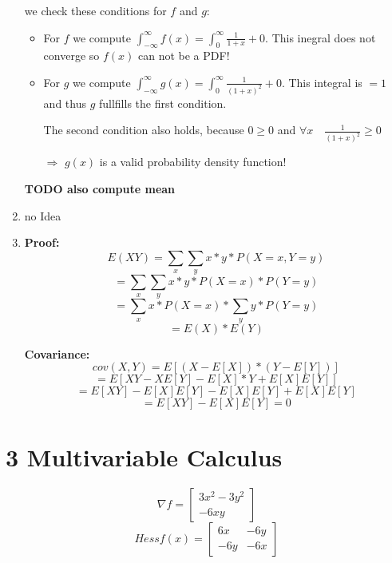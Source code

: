 \documentclass[12pt]{article}
\begin{document}
\begin{enumerate}[1)]
        we check these conditions for $f$ and $g$:
        \begin{itemize}
            \item 
                For $f$ we compute $\int_{-\infty}^{\infty} f(x) = \int_{0}^{\infty} \frac{1}{1+x} + 0$. This inegral does not converge so $f(x)$ can not be a PDF!
            \item
                For $g$ we compute $\int_{-\infty}^{\infty} g(x) = \int_{0}^{\infty} \frac{1}{(1+x)^2} + 0$. This integral is $ = 1$ and thus $g$ fullfills the first condition.

                The second condition also holds, because $0 \geq 0$ and $\forall x \quad \frac{1}{(1+x)^2} \geq 0$

                $\Rightarrow$ $g(x)$ is a valid probability density function!

        \end{itemize}


        \textbf{TODO also compute mean}

    \item
        no Idea

    \item
        \textbf{Proof:}\\
        $$ E( X Y ) = \sum_x \sum_y x * y * P(X=x, Y=y) $$
        $$ = \sum_x \sum_y x * y * P(X=x) * P(Y=y)$$
        $$ = \sum_x  x * P(X=x) * \sum_y y * P(Y=y)$$
        $$ = E(X) * E(Y)$$

        \textbf{Covariance:}\\
        $$ cov(X,Y) = E[(X - E[X]) * (Y - E[Y])] $$
        $$ = E[XY - X E[Y] - E[X]*Y + E[X]E[Y]]$$
        $$ = E[XY] - E[X]E[Y] - E[X]E[Y] + E[X]E[Y]$$
        $$ = E[XY] - E[X]E[Y] = 0$$

                
\end{enumerate}



\newpage
\section*{3 Multivariable Calculus}
 
        $$ \nabla f = \begin{bmatrix}3x^2-3y^2\\-6xy\end{bmatrix} $$
        $$ Hess f(x) = \begin{bmatrix} 6x & -6y \\ -6y & -6x \end{bmatrix} $$
        
\end{document}
